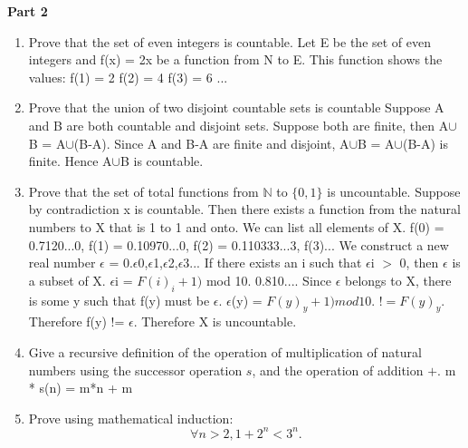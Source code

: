 \documentclass{article}
\newcommand{\nat}{\mathbb{N}}
\begin{document}
\newpage %

\begin{center}
  \textbf{Part 2}
\end{center}

\begin{enumerate}
\item Prove that the set of even integers is countable. 
\newline Let E be the set of even integers and f(x) = 2x be a function from N to E. This function shows the values:
\newline f(1) = 2
\newline f(2) = 4
\newline f(3) = 6 ...
\newline 

\item Prove that the union of two disjoint countable sets is countable
\newline Suppose A and B are both countable and disjoint sets. Suppose both are finite, then A$\cup$B = A$\cup$(B-A). Since A and B-A are finite and disjoint, A$\cup$B = A$\cup$(B-A) is finite. Hence A$\cup$B is countable.

\item Prove that the set of total functions from $\nat$ to $\{0,
  1\}$ is uncountable.
  \newline
  \newline Suppose by contradiction x is countable. Then there exists a function from the natural numbers to X that is 1 to 1 and onto. We can list all elements of X. f(0) = 0.7120...0, f(1) = 0.10970...0, f(2) = 0.110333...3, f(3)...
  \newline We construct a new real number $\epsilon$ = 0.$\epsilon$0,$\epsilon$1,$\epsilon$2,$\epsilon$3...
  If there exists an i such that $\epsilon$i $>$ 0, then $\epsilon$ is a subset of X.
  \newline $\epsilon$i = $F(i)_{i}+1)$ mod 10. 0.810....
  \newline Since $\epsilon$ belongs to X, there is some y such that f(y) must be $\epsilon$. $\epsilon$(y) = $F(y)_{y} +1) mod 10$. $!= F(y)_{y}$.
  \newline Therefore f(y) != $\epsilon$. Therefore X is uncountable.
  
  
\item Give a recursive definition of the operation of multiplication
  of natural numbers  using the successor operation $s$, and the
  operation of addition $+$.
  \newline m * s(n) = m*n + m
  
\item Prove using mathematical induction:
  \[
  \forall n > 2, 1+2^n < 3^n.
  \]
  

\end{enumerate}
\end{document}

